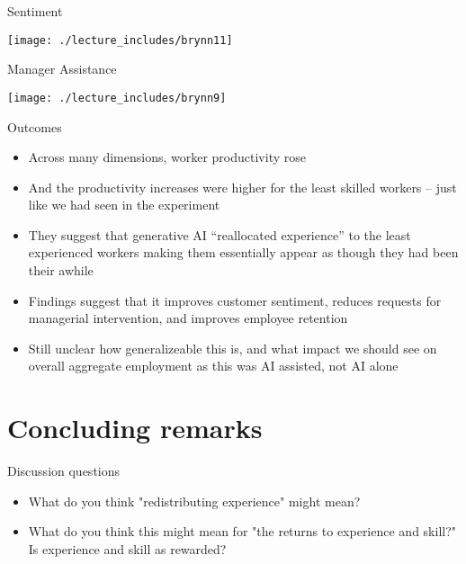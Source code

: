 \documentclass{beamer}
\begin{document}
\begin{frame}{Sentiment}
\begin{center}
\texttt{[image: ./lecture\_includes/brynn11]}
\end{center}
\end{frame}


\begin{frame}{Manager Assistance}
\begin{center}
\texttt{[image: ./lecture\_includes/brynn9]}
\end{center}
\end{frame}


\begin{frame}{Outcomes}

\begin{itemize}

\item Across many dimensions, worker productivity rose
\item And the productivity increases were higher for the least skilled workers -- just like we had seen in the experiment
\item They suggest that generative AI ``reallocated experience'' to the least experienced workers making them essentially appear as though they had been their awhile
\item Findings suggest that it improves customer sentiment, reduces requests for managerial intervention, and improves employee retention
\item Still unclear how generalizeable this is, and what impact we should see on overall aggregate employment as this was AI assisted, not AI alone

\end{itemize}

\end{frame}


\section{Concluding remarks}


\begin{frame}{Discussion questions}

\begin{itemize}

\item What do you think "redistributing experience" might mean?
\item What do you think this might mean for "the returns to experience and skill?"  Is experience and skill as rewarded?
\end{itemize}

\end{frame}
\end{document}
